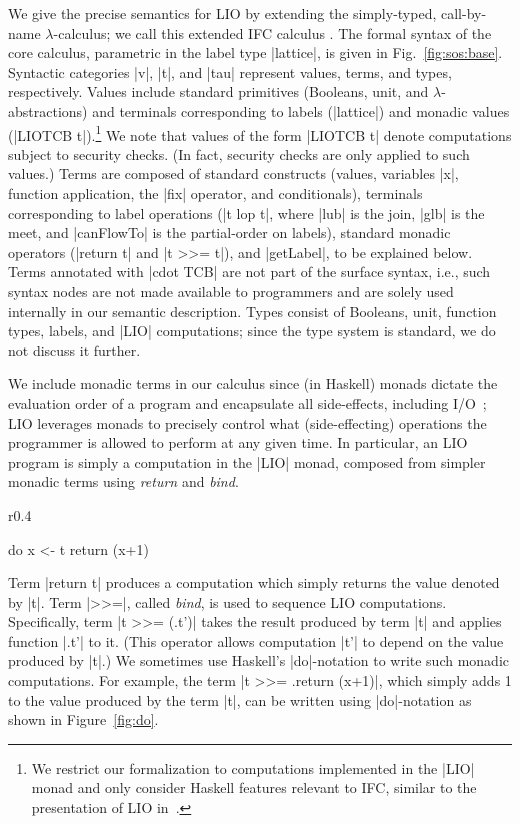 We give the precise semantics for LIO by extending the simply-typed,
call-by-name $\lambda$-calculus;
%
we call this extended IFC calculus \lio.
%
The formal syntax of the core \lio{} calculus, parametric in the label
type |lattice|, is given in Fig.~\ref{fig:sos:base}.
%
Syntactic categories |v|, |t|, and |tau| represent values, terms, and
types, respectively.
%
Values include standard primitives (Booleans, unit, and $\lambda$-abstractions)
and terminals corresponding to labels (|lattice|) and monadic values (|LIOTCB
t|).\footnote{ We restrict our formalization to computations implemented in the
  |LIO| monad and only consider Haskell features relevant to IFC, similar to the
  presentation of LIO in~\cite{stefan:lio,stefan:addressing-covert}.  } We note
that values of the form |LIOTCB t| denote computations subject to security
checks. (In fact, security checks are only applied to such values.)
%
Terms are composed of standard constructs (values, variables |x|, function
application, the |fix| operator, and conditionals), terminals corresponding to
label operations (|t lop t|, where |lub| is the join, |glb| is the meet, and
|canFlowTo| is the partial-order on labels), standard monadic operators (|return
t| and |t >>= t|), and |getLabel|, to be explained below.
%
Terms annotated with |cdot TCB| are not part of the surface syntax,
i.e., such syntax nodes are not made available to programmers and are
solely used internally in our semantic description.
%
Types consist of Booleans, unit, function types, labels, and |LIO|
computations; since the \lio{} type system is standard, we do not
discuss it further.

%
We include monadic terms in our calculus since (in Haskell) monads
dictate the evaluation order of a program and encapsulate all
side-effects, including I/O~\cite{moggi:monads, wadler:monads};
%
LIO leverages monads to precisely control what (side-effecting)
operations the programmer is allowed to perform at any given time.
%
In particular, an LIO program is simply a computation in the |LIO| monad,
composed from simpler monadic terms using \emph{return} and \emph{bind}.
%
\begin{wrapfigure}{r}{0.4\columnwidth}
\vspace{-15pt}
\begin{code}
do  x <- t 
    return (x+1) 
\end{code}
\vspace{-15pt}
\caption{\label{fig:do}|do|-notation}
\end{wrapfigure}
%
Term |return t| produces a computation which simply returns the value
denoted by |t|. Term |>>=|, called \emph{bind}, is used to sequence
LIO computations. Specifically, term |t >>= (\x.t')| takes the result
produced by term |t| and applies function |\x.t'| to it.  (This
operator allows computation |t'| to depend on the value produced by
|t|.)  We sometimes use Haskell’s |do|-notation to write such monadic
computations. For example, the term |t >>= \x.return (x+1)|, which
simply adds 1 to the value produced by the term |t|, can be written
using |do|-notation as shown in Figure~\ref{fig:do}.


